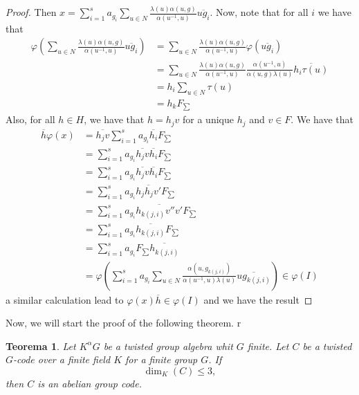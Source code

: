 \documentclass{article}
\newtheorem{theorem}{Teorema}
\begin{document}
\begin{proof}
Then $x=\sum_{i=1}^s a_{g_i} \sum_{u\in N}  \frac{ \lambda(u)\alpha(u,g)}{\alpha(u^{-1},u)} \overline{ug_i}$. Now, note that for all $i$ we have that
\begin{align*}
    \varphi\left(\sum_{u\in N}  \frac{ \lambda(u)\alpha(u,g)}{\alpha(u^{-1},u)} \overline{ug_i}\right) & = \sum_{u\in N}  \frac{ \lambda(u)\alpha(u,g)}{\alpha(u^{-1},u)} \varphi(\overline{ug_i}) \\ & = \sum_{u\in N}  \frac{ \lambda(u)\alpha(u,g)}{\alpha(u^{-1},u)} \frac{\alpha(u^{-1},u) }{\alpha(u,g) \lambda(u)} \overline{ h_i \tau(u)} \\ & = h_i \sum_{u \in N} \tau(u) \\ & = h_k F_{\sum}
\end{align*}
Also, for all $h\in H$, we have that $h=h_j v$ for a unique $h_j$ and $v\in F$. We have that
\begin{align*}
    \overline{h}\varphi(x) & =  \overline{h_jv} \sum_{i=1}^s a_{g_i} \overline{h_i} F_{\sum}  \\ & =  \sum_{i=1}^s a_{g_i} \overline{h_jv}\overline{h_i} F_{\sum}  \\ & =   \sum_{i=1}^s a_{g_i} \overline{h_jv}\overline{h_i} F_{\sum}
    \\ & = \sum_{i=1}^s a_{g_i} \overline{h_jh_jv'}F_{\sum}
     \\ & = \sum_{i=1}^s a_{g_i} \overline{h_{k(j,i)}v''v'}F_{\sum}
     \\ & = \sum_{i=1}^s a_{g_i} \overline{h_{k(j,i)}}F_{\sum} 
     \\ & = \sum_{i=1}^s a_{g_i} F_{\sum} \overline{h_{k(j,i)}}
     \\ & = \varphi\left(\sum_{i=1}^s a_{g_i} \sum_{u\in N}  \frac{\alpha(u,g_{k(j,i)})}{\alpha(u^{-1},u) \lambda(u)}\overline{ug_{k(j,i)}}\right) \in \varphi(I)
\end{align*}
a similar calculation lead to $\varphi(x)\overline{h} \in \varphi(I)$ and we have the result

\end{proof}

Now, we will start the proof of the following theorem. r

\begin{theorem}
    Let $K^\alpha G$ be a twisted group algebra whit $G$ finite. Let $C$ be a twisted $G$-code over a finite field $K$ for a finite group $G$. If
\[
\dim_K(C) \le 3,
\]
then $C$ is an abelian group code.
\end{theorem}
\end{document}
